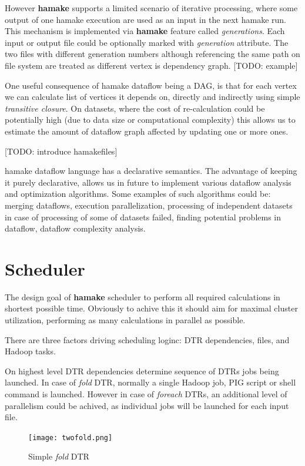 \documentclass[10pt,conference,letterpaper]{IEEEtran}
\begin{document}
However \textbf{hamake} supports a limited scenario of iterative
processing, where some output of one hamake execution are used as an
input in the next hamake run. This mechanism is implemented via
\textbf{hamake} feature called \textit{generations}. Each input or
output file could be optionally marked with \emph{generation}
attribute. The two files with different generation numbers although
referencing the same path on file system are treated as different
vertex is dependency graph. [TODO: example]

One useful consequence of hamake dataflow being a DAG, is that for
each vertex we can calculate list of vertices it depends on, directly
and indirectly using simple \textit{transitive closure}. On datasets,
where the cost of re-calculation could be potentially high (due to
data size or computational complexity) this allows us to estimate the
amount of dataflow graph affected by updating one or more ones.

[TODO: introduce hamakefiles]

hamake dataflow language has a declarative semantics. The advantage of
keeping it purely declarative, allows us in future to implement
various dataflow analysis and optimization algorithms. Some examples
of such algorithms could be: merging dataflows, execution
parallelization, processing of independent datasets in case of
processing of some of datasets failed, finding potential problems in
dataflow, dataflow complexity analysis.

\section{Scheduler}

The design goal of \textbf{hamake} scheduler to perform all required
calculations in shortest possible time. Obviously to achive this it
should aim for maximal cluster utilization, performing as many
calculations in parallel as possible.

There are three factors driving scheduling loginc: DTR dependencies,
files, and Hadoop tasks.

On highest level DTR dependencies determine sequence of DTRs jobs
being launched. In case of \emph{fold} DTR, normally a single Hadoop
job, PIG script or shell command is launched. However in case of
\emph{foreach} DTRs, an additional level of parallelism could be
achived, as individual jobs will be launched for each input file.

\begin{figure}[htp]
\centering
\texttt{[image: twofold.png]}
\caption{Simple \emph{fold} DTR}
\label{fig:fold1}
\end{figure}
\end{document}
